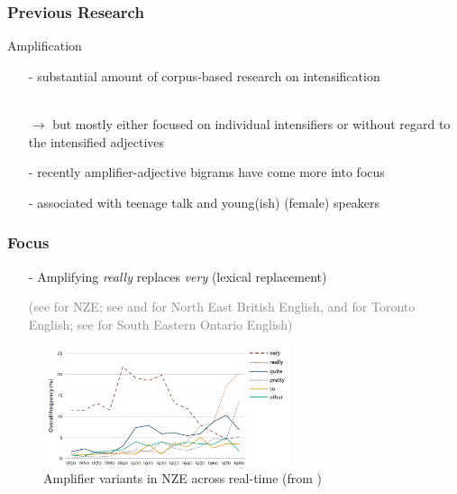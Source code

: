 \documentclass[12pt, table]{beamer}
\begin{document}
\begin{frame}
\frametitle{Previous Research}
Amplification
\begin{itemize}
\item[-] substantial amount of corpus-based research on intensification \textcolor{gray}{\begin{scriptsize}\citep[e.g][]{aijmer2011totally, aijmer2018well, fuchs2016register, fuchs2017women, nunez2014absolutely,palacios2012absolutely}\end{scriptsize}} \\
$\rightarrow$ but mostly either focused on individual intensifiers or without regard to the intensified adjectives
\item[-] recently amplifier-adjective bigrams have come more into focus \textcolor{gray}{\begin{scriptsize}\citep[e.g.][]{schweinberger2017adjectiveintensifiers, wagner2017icame, wagner2017totally}
\end{scriptsize}} 
\item[-] associated with teenage talk and young(ish) (female) speakers \\\textcolor{gray}{\begin{scriptsize}\citep{bauer2002adjective, darcy2015stability, macaulay2006pure, tagliamonte2006so, tagliamonte2008intensifiers}\end{scriptsize}}
\end{itemize}
\end{frame}

\begin{frame}
\frametitle{Focus}
\begin{itemize}
\item[-] Amplifying \textit{really} replaces \textit{very} (lexical replacement)\\
\textcolor{gray}{\begin{scriptsize} (see \citet{darcy2015stability} for NZE; see \citet[][]{ito2003well} and \citet[][]{barnfield2010intensifiers} for North East British English, \citet{tagliamonte2008intensifiers} and \citet[][]{tagliamonte2014expanding} for Toronto English; see \citet[][]{tagliamonte2014expanding} for South Eastern Ontario English)\end{scriptsize}} 
\end{itemize}
\begin{center}
\begin{figure}
\includegraphics[height=3.5cm]{images/DarcyRealTime.png}
\caption{Amplifier variants in NZE across real-time (from \citet[468]{darcy2015stability})}
\end{figure}
\end{center}
\end{frame}
\end{document}
